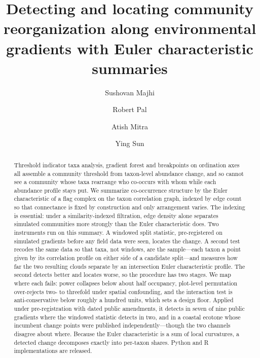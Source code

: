 \documentclass[review,12pt,authoryear]{elsarticle}
\theoremstyle{remark}
\begin{document}
\ifdefined\ESAMODE\linenumbers\fi

\begin{frontmatter}

\title{Detecting and locating community reorganization along environmental
gradients with Euler characteristic summaries}

\author[gwu]{Sushovan Majhi}
\author[mtubio]{Robert Pal}
\author[mtumath]{Atish Mitra}
\author[rf]{Ying Sun}


\begin{abstract}
Threshold indicator taxa analysis, gradient forest and breakpoints on
ordination axes all assemble a community threshold from taxon-level
abundance change, and so cannot see a community whose taxa rearrange who
co-occurs with whom while each abundance profile stays put. We summarize
co-occurrence structure by the Euler characteristic of a flag complex on the
taxon correlation graph, indexed by edge count so that connectance is fixed
by construction and only arrangement varies. The indexing is essential:
under a similarity-indexed filtration, edge density alone separates
simulated communities more strongly than the Euler characteristic does. Two
instruments run on this summary. A windowed split statistic, pre-registered
on simulated gradients before any field data were seen, locates the change.
A second test recodes the same data so that taxa, not windows, are the
sample---each taxon a point given by its correlation profile on either side
of a candidate split---and measures how far the two resulting clouds
separate by an intersection Euler characteristic profile. The second detects
better and locates worse, so the procedure has two stages. We map where each
fails: power collapses below about half occupancy, plot-level permutation
over-rejects two- to threefold under spatial confounding, and the
interaction test
is anti-conservative below roughly a hundred units, which sets a design
floor. Applied under pre-registration with dated public amendments, it
detects in seven of nine public gradients where the windowed statistic
detects in two, and in a coastal ecotone whose incumbent change points were
published independently---though the two channels disagree about where.
Because the Euler characteristic is a sum of local curvatures, a detected
change decomposes exactly into per-taxon shares. Python and R
implementations are released.
\end{abstract}


\end{frontmatter}
\end{document}
